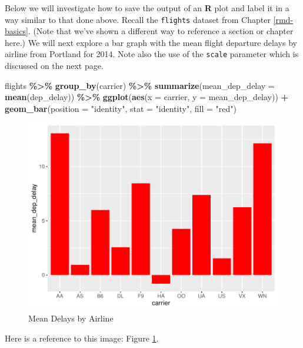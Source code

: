 \documentclass[12pt,twoside]{deuthesis}
\newenvironment{Shaded}{\begin{snugshade}}{\end{snugshade}}
\newcommand{\AttributeTok}[1]{\textcolor[rgb]{0.13,0.29,0.53}{#1}}
\newcommand{\FunctionTok}[1]{\textcolor[rgb]{0.13,0.29,0.53}{\textbf{#1}}}
\newcommand{\NormalTok}[1]{#1}
\newcommand{\SpecialCharTok}[1]{\textcolor[rgb]{0.81,0.36,0.00}{\textbf{#1}}}
\newcommand{\StringTok}[1]{\textcolor[rgb]{0.31,0.60,0.02}{#1}}
\begin{document}
Below we will investigate how to save the output of an \textbf{R} plot and label it in a way similar to that done above. Recall the \texttt{flights} dataset from Chapter \ref{rmd-basics}. (Note that we've shown a different way to reference a section or chapter here.) We will next explore a bar graph with the mean flight departure delays by airline from Portland for 2014. Note also the use of the \texttt{scale} parameter which is discussed on the next page.
\begin{Shaded}
\begin{Highlighting}[]
\NormalTok{flights }\SpecialCharTok{\%\textgreater{}\%} \FunctionTok{group\_by}\NormalTok{(carrier) }\SpecialCharTok{\%\textgreater{}\%}
  \FunctionTok{summarize}\NormalTok{(}\AttributeTok{mean\_dep\_delay =} \FunctionTok{mean}\NormalTok{(dep\_delay)) }\SpecialCharTok{\%\textgreater{}\%}
  \FunctionTok{ggplot}\NormalTok{(}\FunctionTok{aes}\NormalTok{(}\AttributeTok{x =}\NormalTok{ carrier, }\AttributeTok{y =}\NormalTok{ mean\_dep\_delay)) }\SpecialCharTok{+}
  \FunctionTok{geom\_bar}\NormalTok{(}\AttributeTok{position =} \StringTok{"identity"}\NormalTok{, }\AttributeTok{stat =} \StringTok{"identity"}\NormalTok{, }\AttributeTok{fill =} \StringTok{"red"}\NormalTok{)}
\end{Highlighting}
\end{Shaded}
\begin{figure}
\centering
\includegraphics{BP_Rapor_files/figure-latex/delaysboxplot-1.pdf}
\caption{\label{fig:delaysboxplot}Mean Delays by Airline}
\end{figure}
Here is a reference to this image: Figure \ref{fig:delaysboxplot}.
\end{document}
